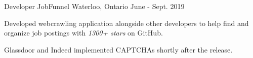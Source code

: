 \begin{cventries}

\cventry
  {Developer} %
  {JobFunnel} %
  {Waterloo, Ontario} %
  {June - Sept. 2019} %
  {
    \begin{cvitems} %
      \item {Developed webcrawling application alongside other developers to help find and organize job postings with \textit{1300+ stars} on GitHub.}
      \item {Glassdoor and Indeed implemented CAPTCHAs shortly after the release. }
    \end{cvitems}
  }


\end{cventries}
